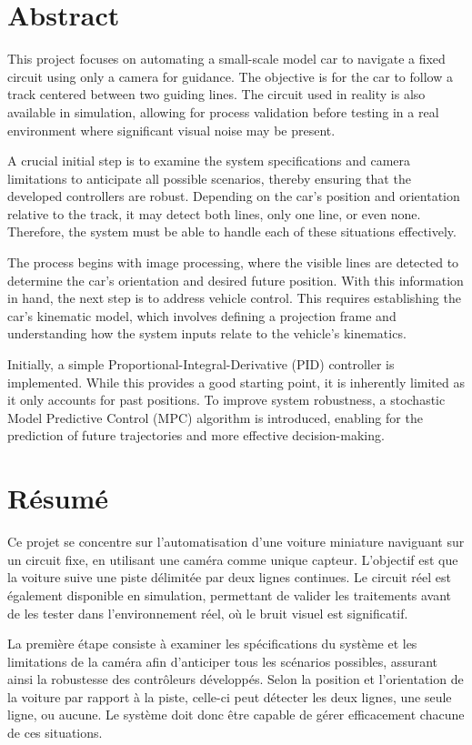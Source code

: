 \section*{\small Abstract}
\small
This project focuses on automating a small-scale model car to navigate a fixed circuit using only a camera for guidance. The objective is for the car to follow a track centered between two guiding lines. The circuit used in reality is also available in simulation, allowing for process validation before testing in a real environment where significant visual noise may be present.

A crucial initial step is to examine the system specifications and camera limitations to anticipate all possible scenarios, thereby ensuring that the developed controllers are robust. Depending on the car's position and orientation relative to the track, it may detect both lines, only one line, or even none. Therefore, the system must be able to handle each of these situations effectively.

The process begins with image processing, where the visible lines are detected to determine the car's orientation and desired future position. With this information in hand, the next step is to address vehicle control. This requires establishing the car's kinematic model, which involves defining a projection frame and understanding how the system inputs relate to the vehicle's kinematics.

Initially, a simple Proportional-Integral-Derivative (\acs{PID}) controller is implemented. While this provides a good starting point, it is inherently limited as it only accounts for past positions. To improve system robustness, a stochastic Model Predictive Control (\acs{MPC}) algorithm is introduced, enabling for the prediction of future trajectories and more effective decision-making.


\section*{\small R\'esum\'e}
Ce projet se concentre sur l'automatisation d'une voiture miniature naviguant sur un circuit fixe, en utilisant une cam\'era comme unique capteur. L'objectif est que la voiture suive une piste d\'elimit\'ee par deux lignes continues. Le circuit r\'eel est \'egalement disponible en simulation, permettant de valider les traitements avant de les tester dans l'environnement r\'eel, o\`u le bruit visuel est significatif.

La premi\`ere \'etape consiste \`a examiner les sp\'ecifications du syst\`eme et les limitations de la cam\'era afin d'anticiper tous les sc\'enarios possibles, assurant ainsi la robustesse des contr\^oleurs d\'evelopp\'es. Selon la position et l'orientation de la voiture par rapport \`a la piste, celle-ci peut d\'etecter les deux lignes, une seule ligne, ou aucune. Le syst\`eme doit donc \^etre capable de g\'erer efficacement chacune de ces situations.

